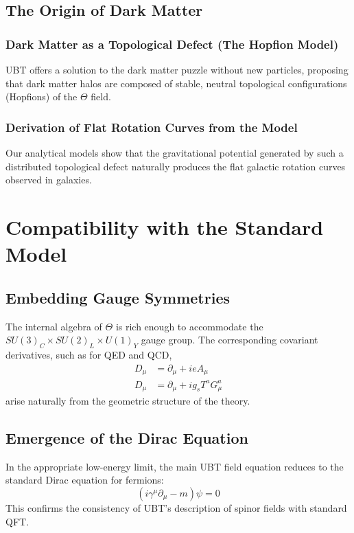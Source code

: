 \documentclass[12pt, a4paper]{article}
\begin{document}
\subsection{The Origin of Dark Matter}
\subsubsection{Dark Matter as a Topological Defect (The Hopfion Model)}
UBT offers a solution to the dark matter puzzle without new particles, proposing that dark matter halos are composed of stable, neutral topological configurations (Hopfions) of the \( \Theta \) field.

\subsubsection{Derivation of Flat Rotation Curves from the Model}
Our analytical models show that the gravitational potential generated by such a distributed topological defect naturally produces the flat galactic rotation curves observed in galaxies.

\section{Compatibility with the Standard Model}
\subsection{Embedding Gauge Symmetries}
The internal algebra of \( \Theta \) is rich enough to accommodate the \( SU(3)_C \times SU(2)_L \times U(1)_Y \) gauge group. The corresponding covariant derivatives, such as for QED and QCD,
\begin{align}
    D_\mu &= \partial_\mu + i e A_\mu \\
    D_\mu &= \partial_\mu + i g_s T^a G_\mu^a
\end{align}
arise naturally from the geometric structure of the theory.

\subsection{Emergence of the Dirac Equation}
In the appropriate low-energy limit, the main UBT field equation reduces to the standard Dirac equation for fermions:
\begin{equation}
    (i \gamma^\mu \partial_\mu - m)\psi = 0
\end{equation}
This confirms the consistency of UBT's description of spinor fields with standard QFT.
\end{document}
